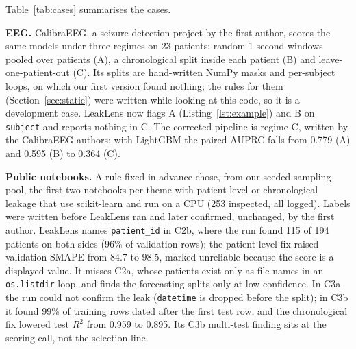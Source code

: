 \documentclass[10pt,a4paper,twocolumn]{article}
\newcommand{\tool}{LeakLens}
\newcommand{\code}[1]{\texttt{#1}}
\begin{document}
Table~\ref{tab:cases} summarises the cases.

\textbf{EEG.} CalibraEEG, a seizure-detection project by the first author, scores the same models under three
regimes on 23 patients: random 1-second windows pooled over patients (A), a chronological split inside each
patient (B) and leave-one-patient-out (C). Its splits are hand-written NumPy masks and per-subject loops, on which our first version found nothing; the rules for
them (Section~\ref{sec:static}) were written while looking at this code, so it is a development case. \tool{} now flags A (Listing~\ref{lst:example}) and B on \code{subject} and
reports nothing in C. The corrected pipeline is regime C, written by the CalibraEEG authors; with LightGBM the
paired AUPRC falls from 0.779 (A) and 0.595 (B) to 0.364 (C).

\textbf{Public notebooks.} A rule fixed in advance chose, from our seeded sampling pool, the first two notebooks per
theme with patient-level or chronological leakage that use scikit-learn and run on a CPU (253 inspected, all
logged). Labels were written before \tool{} ran and later confirmed, unchanged, by the first author. \tool{} names
\code{patient\_id} in C2b, where the run found 115 of 194 patients on both sides (96\% of validation rows); the
patient-level fix raised validation SMAPE from 84.7 to 98.5, marked unreliable because the score is a displayed
value. It misses C2a, whose patients exist only as file names in an \code{os.listdir} loop, and finds the
forecasting splits only at low confidence. In C3a the run could not confirm the leak (\code{datetime} is dropped
before the split); in C3b it found 99\% of training rows dated after the first test row, and the chronological fix
lowered test $R^2$ from 0.959 to 0.895. Its C3b multi-test finding sits at the scoring call, not the selection line.
\end{document}
